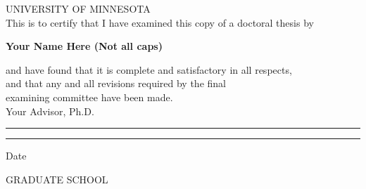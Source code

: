 \begin{center}
{\large UNIVERSITY OF MINNESOTA}\\

\vspace{0.5in}
This is to certify that I have examined this copy of a doctoral 
thesis by       

\vspace{0.5in}
{\large {\bf Your Name Here (Not all caps) }}

\vspace{0.5in}
and have found that it is complete and satisfactory in all respects,\\
and that any and all revisions required by the final \\
examining committee have been made.\\

\vspace{0.5in}
{\large Your Advisor, Ph.D.} 

\vspace{0.7in}
\noindent \rule{2.7in}{0.01in} 

\vspace{0.6in}
\noindent \rule{2.7in}{0.01in} 


\vspace{0.1in}
Date 

\vspace{0.6in}
{\large GRADUATE SCHOOL}
\end{center}

